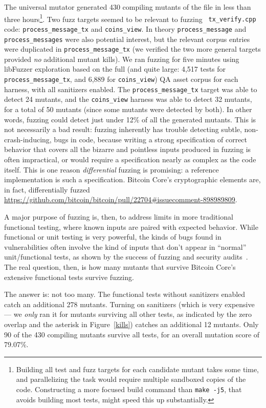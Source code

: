 \begin{sloppypar}
The universal mutator generated 430 compiling mutants of the file in
less than three hours\footnote{Building all test and fuzz targets for each
candidate mutant takes some time, and parallelizing the task would
require multiple sandboxed copies of the code. Constructing a more
focused build command than {\tt make -j5}, that avoids building most tests, might speed this up substantially.}.
Two fuzz targets seemed to be relevant to fuzzing {\tt
  tx\_verify.cpp} code: {\tt process\_message\_tx} and {\tt coins\_view}.
In theory {\tt process\_message} and {\tt process\_messages} were
also potential interest, but the relevant corpus entries were
duplicated in {\tt process\_message\_tx} (we verified the two more
general targets provided \emph{no}
additional mutant kills). We ran fuzzing for five minutes using
libFuzzer exploration based on the full (and quite large: 4,517 tests for
{\tt process\_message\_tx}, and 6,889 for {\tt coins\_view}) QA asset corpus for each
harness, with all sanitizers enabled. The {\tt process\_message\_tx} target was
able to detect 24 mutants, and the {\tt coins\_view} harness was able to detect
32 mutants, for a total of 50 mutants (since some mutants were
detected by both). In other words, fuzzing could detect just under 12\%
of all the generated mutants. This is not necessarily a bad result: fuzzing inherently has
trouble detecting subtle, non-crash-inducing, bugs in code, because writing a
strong specification of correct behavior that covers all the bizarre and
pointless inputs produced in fuzzing is often impractical, or would require a
specification nearly as complex as the code itself. This is one reason
\emph{differential} fuzzing is promising: a reference implementation is such a
specification. Bitcoin Core's cryptographic elements are, in fact,
differentially fuzzed
\url{https://github.com/bitcoin/bitcoin/pull/22704#issuecomment-898989809}.
\end{sloppypar}


A major purpose of fuzzing is, then, to address limits in more
traditional functional testing, where known inputs are paired with
expected behavior.  While functional or unit testing is very powerful,
the kinds of bugs found in vulnerabilities often involve the kind of
inputs that don't appear in ``normal'' unit/functional tests, as shown
by the success of fuzzing and security audits~\cite{FC20}.  The real
question, then, is how many mutants that survive Bitcoin Core's
extensive functional tests survive fuzzing.

The answer is: not too many.  The functional tests without sanitizers
enabled catch an additional 278 mutants.  Turning on sanitizers (which
is very expensive --- we \emph{only} ran it for mutants surviving all other
tests, as indicated by the zero overlap and the asterisk in Figure~\ref{kills}) catches an additional 12 mutants.  Only 90 of the
430 compiling mutants survive all tests, for an overall mutation score
of 79.07\%.

